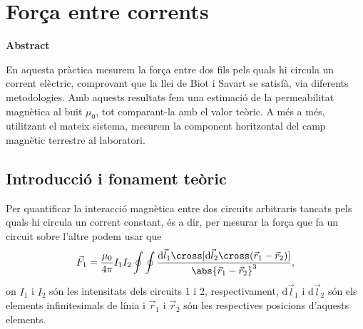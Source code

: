 \documentclass[a4paper,10.5pt]{report}
\newenvironment{chapterabstract}{
	\begin{center}
		\bfseries Abstract
	\end{center}
	\quotation
}{\endquotation}
\begin{document}
\chapter{Força entre corrents}
\begin{chapterabstract}
	En aquesta pràctica mesurem la força entre dos fils pels quals hi circula un corrent elèctric, comprovant que la llei de Biot i Savart se satisfà, via diferents metodologies. Amb aquests resultats fem una estimació de la permeabilitat magnètica al buit $\mu_0$, tot comparant-la amb el valor teòric. A més a més, utilitzant el mateix sistema, mesurem la component horitzontal del camp magnètic terrestre al laboratori.
\end{chapterabstract}
\section{Introducció i fonament teòric}
Per quantificar la interacció magnètica entre dos circuits arbitraris tancats pels quals hi circula un corrent constant, és a dir, per mesurar la força que fa un circuit sobre l'altre podem usar que
\begin{equation}
	\vec{F}_1 = \frac{\mu_0}{4\pi}I_1I_2\oint \oint \frac{\mathrm{d}\vec{l}_1\cross[\mathrm{d}\vec{l}_2 \cross (\vec{r}_1-\vec{r}_2)]}{\abs{\vec{r}_1 - \vec{r}_2}^3}\label{eq:2.1},
\end{equation}
on $I_1$ i $I_2$ són les intensitats dels circuits 1 i 2, respectivament, d$\vec{l}_1$ i d$\vec{l}_2$ són els elements infinitesimals de línia i $\vec{r}_1$ i $\vec{r}_2$ són les respectives posicions d'aquests elements.
\end{document}
